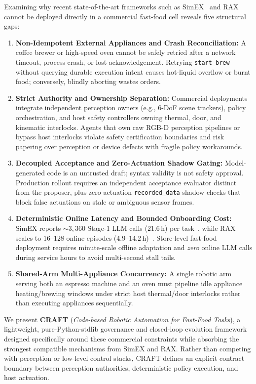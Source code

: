\documentclass[10pt,journal]{IEEEtran}
\begin{document}
Examining why recent state-of-the-art frameworks such as SimEX~\cite{hu2026simex} and RAX~\cite{huang2026rax} cannot be deployed directly in a commercial fast-food cell reveals five structural gaps:
\begin{enumerate}
    \item \textbf{Non-Idempotent External Appliances and Crash Reconciliation:} A coffee brewer or high-speed oven cannot be safely retried after a network timeout, process crash, or lost acknowledgement. Retrying \texttt{start\_brew} without querying durable execution intent causes hot-liquid overflow or burnt food; conversely, blindly aborting wastes orders.
    \item \textbf{Strict Authority and Ownership Separation:} Commercial deployments integrate independent perception owners (e.g., 6-DoF scene trackers), policy orchestration, and host safety controllers owning thermal, door, and kinematic interlocks. Agents that own raw RGB-D perception pipelines or bypass host interlocks violate safety certification boundaries and risk papering over perception or device defects with fragile policy workarounds.
    \item \textbf{Decoupled Acceptance and Zero-Actuation Shadow Gating:} Model-generated code is an untrusted draft; syntax validity is not safety approval. Production rollout requires an independent acceptance evaluator distinct from the proposer, plus zero-actuation \texttt{recorded\_data} shadow checks that block false actuations on stale or ambiguous sensor frames.
    \item \textbf{Deterministic Online Latency and Bounded Onboarding Cost:} SimEX reports $\sim 3{,}360$ Stage-1 LLM calls ($21.6\,\mathrm{h}$) per task~\cite{hu2026simex}, while RAX scales to $16$--$128$ online episodes ($4.9$--$14.2\,\mathrm{h}$)~\cite{huang2026rax}. Store-level fast-food deployment requires minute-scale offline adaptation and \emph{zero} online LLM calls during service hours to avoid multi-second stall tails.
    \item \textbf{Shared-Arm Multi-Appliance Concurrency:} A single robotic arm serving both an espresso machine and an oven must pipeline idle appliance heating/brewing windows under strict host thermal/door interlocks rather than executing appliances sequentially.
\end{enumerate}

We present \textbf{CRAFT} (\emph{Code-based Robotic Automation for Fast-Food Tasks}), a lightweight, pure-Python-stdlib governance and closed-loop evolution framework designed specifically around these commercial constraints while absorbing the strongest compatible mechanisms from SimEX and RAX. Rather than competing with perception or low-level control stacks, CRAFT defines an explicit contract boundary between perception authorities, deterministic policy execution, and host actuation.
\end{document}
